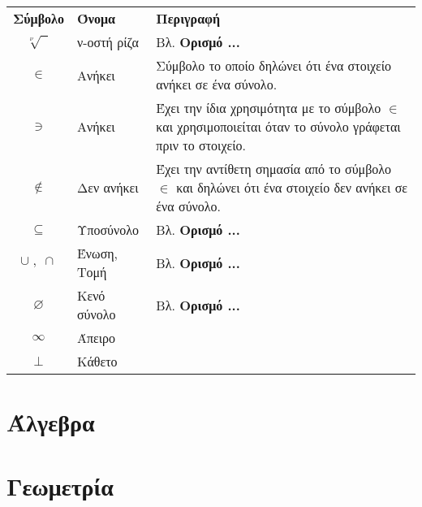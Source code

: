 \documentclass[twoside,11pt,a4paper]{book}
\begin{document}
\newpage
\noindent
{\par\centering
\begin{tabularx}{\textwidth}{c|>{\centering}m{3.1cm}|>{\centering\arraybackslash}m{11.75cm}}
\hline\rule[-2ex]{0pt}{5.5ex}\textbf{Σύμβολο} & \textbf{Όνομα} & \textbf{Περιγραφή}\\
\hhline{===}\rule[-2ex]{0pt}{8.5ex}
$ \sqrt[\nu]{\;\;} $ & ν-οστή ρίζα & Βλ. \textbf{Ορισμό ...} \\
$ \in $ & Ανήκει & Σύμβολο το οποίο δηλώνει ότι ένα στοιχείο ανήκει σε ένα σύνολο. \\
\rule[-2ex]{0pt}{7.5ex}
$ \ni $ & Ανήκει & Έχει την ίδια χρησιμότητα με το σύμβολο $ \in $ και χρησιμοποιείται όταν το σύνολο γράφεται πριν το στοιχείο. \\
\rule[-2ex]{0pt}{7.5ex}
$ \notin $ & Δεν ανήκει & Έχει την αντίθετη σημασία από το σύμβολο $ \in $ και δηλώνει ότι ένα στοιχείο δεν ανήκει σε ένα σύνολο. \\
\rule[-2ex]{0pt}{5.5ex}
$ \subseteq $ & Υποσύνολο & Βλ. \textbf{Ορισμό ...} \\
\rule[-2ex]{0pt}{5.5ex}
$ \cup\;,\;\cap $ & Ένωση, Τομή & Βλ. \textbf{Ορισμό ...} \\
\rule[-2ex]{0pt}{5.5ex}
$ \varnothing $ & Κενό σύνολο & Βλ. \textbf{Ορισμό ...} \\
\rule[-2ex]{0pt}{5.5ex}
$ \infty $ & Άπειρο & \\
\rule[-2ex]{0pt}{5.5ex}
$ \bot $ & Κάθετο & \\
\hline
\end{tabularx}
\par}
\mainmatter
\part{Άλγεβρα}
\pagestyle{fancy}
%

\part{Γεωμετρία}
\backmatter
\pagestyle{empty}
\listoffigures
\listoftables
\end{document}
